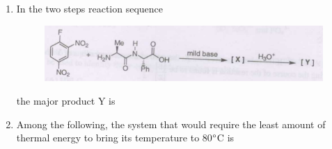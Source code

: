 \documentclass[journal,12pt,onecolumn]{IEEEtran}
\theoremstyle{remark}
\begin{document}
\begin{enumerate}
\item In the two steps reaction sequence
    \begin{figure}[H]
        \centering
        \includegraphics[width=0.8\columnwidth]{q14}
        \caption*{}
        \label{fig:q14}
    \end{figure}
 
    the major product Y is
    \begin{enumerate}
        

\end{enumerate}
\hfill{}



\item Among the following, the system that would require the least amount of thermal energy to bring its temperature to 80$\degree$C is
    \begin{enumerate}
        \begin{multicols}{2}
   

\end{multicols}
\end{enumerate}
\end{enumerate}
\end{document}
